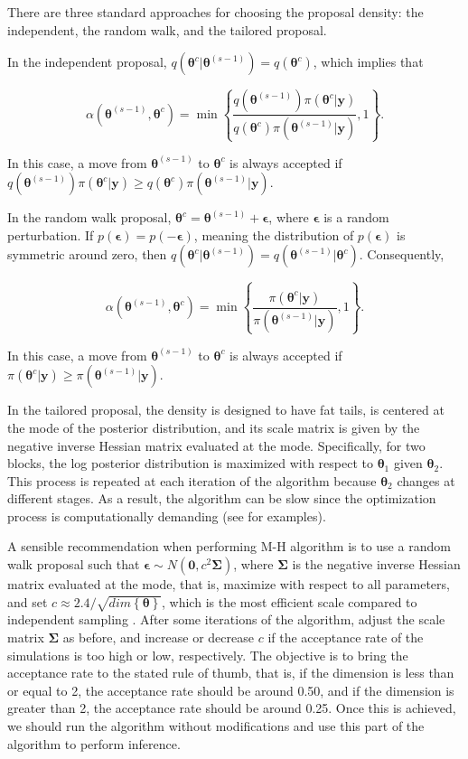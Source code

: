There are three standard approaches for choosing the proposal density: the independent, the random walk, and the tailored proposal. 

In the independent proposal, $q(\bm{\theta}^{c} | \bm{\theta}^{(s-1)}) = q(\bm{\theta}^{c})$, which implies that 

\[
\alpha(\bm{\theta}^{(s-1)}, \bm{\theta}^{c}) = 
\min\left\{\frac{q(\bm{\theta}^{(s-1)}) \pi(\bm{\theta}^{c} | \bm{y})}{q(\bm{\theta}^{c}) \pi(\bm{\theta}^{(s-1)} | \bm{y})}, 1\right\}.
\]

In this case, a move from $\bm{\theta}^{(s-1)}$ to $\bm{\theta}^{c}$ is always accepted if $q(\bm{\theta}^{(s-1)}) \pi(\bm{\theta}^{c} | \bm{y}) \geq q(\bm{\theta}^{c}) \pi(\bm{\theta}^{(s-1)} | \bm{y})$.

In the random walk proposal, $\bm{\theta}^{c} = \bm{\theta}^{(s-1)} + \bm{\epsilon}$, where $\bm{\epsilon}$ is a random perturbation. If $p(\bm{\epsilon}) = p(-\bm{\epsilon})$, meaning the distribution of $p(\bm{\epsilon})$ is symmetric around zero, then $q(\bm{\theta}^{c} | \bm{\theta}^{(s-1)}) = q(\bm{\theta}^{(s-1)} | \bm{\theta}^{c})$. Consequently, 

\[
\alpha(\bm{\theta}^{(s-1)}, \bm{\theta}^{c}) = 
\min\left\{\frac{\pi(\bm{\theta}^{c} | \bm{y})}{\pi(\bm{\theta}^{(s-1)} | \bm{y})}, 1\right\}.
\]

In this case, a move from $\bm{\theta}^{(s-1)}$ to $\bm{\theta}^{c}$ is always accepted if $\pi(\bm{\theta}^{c} | \bm{y}) \geq \pi(\bm{\theta}^{(s-1)} | \bm{y})$.

In the tailored proposal, the density is designed to have fat tails, is centered at the mode of the posterior distribution, and its scale matrix is given by the negative inverse Hessian matrix evaluated at the mode. Specifically, for two blocks, the log posterior distribution is maximized with respect to $\bm{\theta}_1$ given $\bm{\theta}_2$. This process is repeated at each iteration of the algorithm because $\bm{\theta}_2$ changes at different stages. As a result, the algorithm can be slow since the optimization process is computationally demanding (see \cite[Chap.~7 and 9]{greenberg2012introduction} for examples).

A sensible recommendation when performing M-H algorithm is to use a random walk proposal such that $\bm{\epsilon}\sim N(\bm{0},c^2\bm{\Sigma})$, where $\bm{\Sigma}$ is the negative inverse Hessian matrix evaluated at the mode, that is, maximize with respect to all parameters, and set $c\approx 2.4/\sqrt{dim\left\{\bm{\theta}\right\}}$, which is the most efficient scale compared to independent sampling \cite[Chap.~12]{gelman2021bayesian}. After some iterations of the algorithm, adjust the scale matrix $\bm{\Sigma}$ as before, and increase or decrease $c$ if the acceptance rate of the simulations is too high or low, respectively. The objective is to bring the acceptance rate to the stated rule of thumb, that is, if the dimension is less than or equal to 2, the acceptance rate should be around 0.50, and if the dimension is greater than 2, the acceptance rate should be around 0.25. Once this is achieved, we should run the algorithm without modifications and use this part of the algorithm to perform inference.\\


